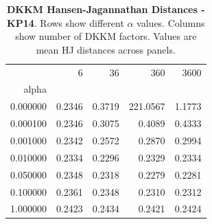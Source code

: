 \begin{table}[h]
\centering
\begin{tabular}{rrrrr}
\toprule
 & 6 & 36 & 360 & 3600 \\
alpha &  &  &  &  \\
\midrule
0.000000 & 0.2346 & 0.3719 & 221.0567 & 1.1773 \\
0.000100 & 0.2346 & 0.3075 & 0.4089 & 0.4333 \\
0.001000 & 0.2342 & 0.2572 & 0.2870 & 0.2994 \\
0.010000 & 0.2334 & 0.2296 & 0.2329 & 0.2334 \\
0.050000 & 0.2348 & 0.2318 & 0.2279 & 0.2281 \\
0.100000 & 0.2361 & 0.2348 & 0.2310 & 0.2312 \\
1.000000 & 0.2423 & 0.2434 & 0.2421 & 0.2424 \\
\bottomrule
\end{tabular}
\caption{\textbf{DKKM Hansen-Jagannathan Distances - KP14}.
    Rows show different $\alpha$ values. Columns show number of DKKM factors.
    Values are mean HJ distances across panels.}
\label{tab:dkkm_hjd_kp14}

\end{table}